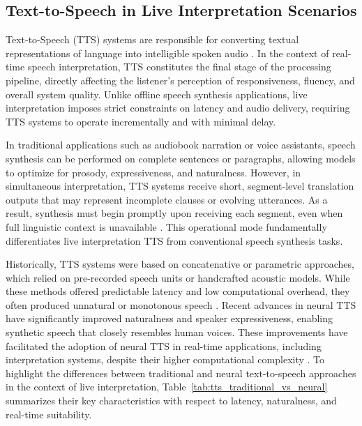 \vspace{3cm}
\subsection{Text-to-Speech in Live Interpretation Scenarios}

Text-to-Speech (TTS) systems are responsible for converting textual representations of language into intelligible spoken audio \cite{tan2021tts_survey}. In the context of real-time speech interpretation, TTS constitutes the final stage of the processing pipeline, directly affecting the listener’s perception of responsiveness, fluency, and overall system quality. Unlike offline speech synthesis applications, live interpretation imposes strict constraints on latency and audio delivery, requiring TTS systems to operate incrementally and with minimal delay.

In traditional applications such as audiobook narration or voice assistants, speech synthesis can be performed on complete sentences or paragraphs, allowing models to optimize for prosody, expressiveness, and naturalness. However, in simultaneous interpretation, TTS systems receive short, segment-level translation outputs that may represent incomplete clauses or evolving utterances. As a result, synthesis must begin promptly upon receiving each segment, even when full linguistic context is unavailable \cite{popescu-belis2025s2streview}. This operational mode fundamentally differentiates live interpretation TTS from conventional speech synthesis tasks.

Historically, TTS systems were based on concatenative or parametric approaches, which relied on pre-recorded speech units or handcrafted acoustic models. While these methods offered predictable latency and low computational overhead, they often produced unnatural or monotonous speech \cite{cohn2020perceptionTTS}. Recent advances in neural TTS have significantly improved naturalness and speaker expressiveness, enabling synthetic speech that closely resembles human voices. These improvements have facilitated the adoption of neural TTS in real-time applications, including interpretation systems, despite their higher computational complexity \cite{cohn2020perceptionTTS}. To highlight the differences between traditional and neural text-to-speech approaches in the context of live interpretation, Table~\ref{tab:tts_traditional_vs_neural} summarizes their key characteristics with respect to latency, naturalness, and real-time suitability.

